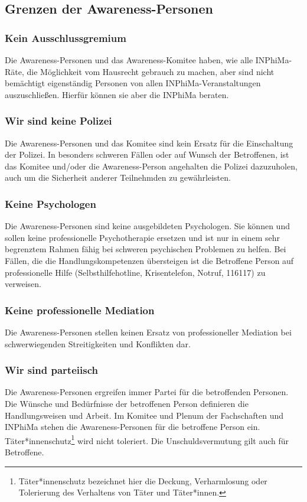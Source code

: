 \documentclass{article}
\begin{document}
\subsection{Grenzen der Awareness-Personen}

\subsubsection{Kein Ausschlussgremium}
Die Awareness-Personen und das Awareness-Komitee haben, wie alle INPhiMa-Räte, die Möglichkeit vom Hausrecht gebrauch zu machen, aber sind nicht bemächtigt eigenständig Personen von allen INPhiMa-Veranstaltungen auszuschließen. Hierfür können sie aber die INPhiMa beraten.

\subsubsection{Wir sind keine Polizei}
Die Awareness-Personen und das Komitee sind kein Ersatz für die Einschaltung der Polizei. In besonders schweren Fällen oder auf Wunsch der Betroffenen, ist das Komitee und/oder die Awareness-Person angehalten die Polizei dazuzuholen, auch um die Sicherheit anderer Teilnehmden zu gewährleisten.

\subsubsection{Keine Psychologen}
Die Awareness-Personen sind keine ausgebildeten Psychologen. Sie können und sollen keine professionelle Psychotherapie ersetzen und ist nur in einem sehr begrenztem Rahmen fähig bei schweren psychischen Problemen zu helfen. Bei Fällen, die die Handlungskompetenzen übersteigen ist die Betroffene Person auf professionelle Hilfe (Selbsthilfehotline, Krisentelefon, Notruf, 116117) zu verweisen. 

\subsubsection{Keine professionelle Mediation}
Die Awareness-Personen stellen keinen Ersatz von professioneller Mediation bei schwerwiegenden Streitigkeiten und Konflikten dar. 

\subsubsection{Wir sind parteiisch}
Die Awareness-Personen ergreifen immer Partei für die betroffenden Personen. Die Wünsche und Bedürfnisse der betroffenen Person definieren die Handlungsweisen und Arbeit. Im Komitee und Plenum der Fachschaften und INPhiMa stehen die Awareness-Personen für die betroffene Person ein. Täter*innenschutz\footnote{Täter*innenschutz bezeichnet hier die Deckung, Verharmlosung oder Tolerierung des Verhaltens von Täter und Täter*innen.} wird nicht toleriert. Die Unschuldsvermutung gilt auch für Betroffene.
\end{document}
